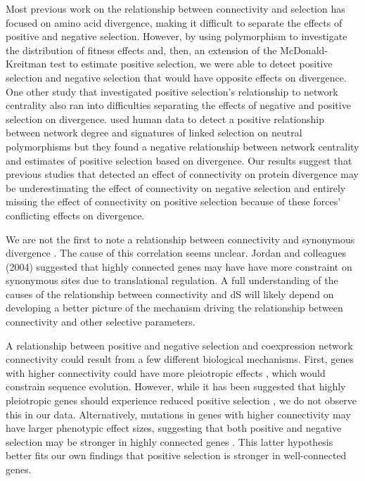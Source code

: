 Most previous work on the relationship between connectivity and selection has focused on amino acid divergence, making it difficult to separate the effects of positive and negative selection. However, by using polymorphism to investigate the distribution of fitness effects and, then, an extension of the McDonald-Kreitman test to estimate positive selection, we were able to detect positive selection and negative selection that would have opposite effects on divergence. One other study that investigated positive selection’s relationship to network centrality also ran into difficulties separating the effects of negative and positive selection on divergence. \citet{Luisi2015-zz} used human data to detect a positive relationship between network degree and signatures of linked selection on neutral polymorphisms but they found a negative relationship between network centrality and estimates of positive selection based on divergence.  Our results suggest that previous studies that detected an effect of connectivity on protein divergence may be underestimating the effect of connectivity on negative selection and entirely missing the effect of connectivity on positive selection because of these forces’ conflicting effects on divergence.

We are not the first to note a relationship between connectivity and synonymous divergence \citep{Jordan2004-vj}. The cause of this correlation seems unclear. Jordan and colleagues (2004) suggested that highly connected genes may have have more constraint on synonymous sites due to translational regulation. A full understanding of the causes of the relationship between connectivity and dS will likely depend on developing a better picture of the mechanism driving the relationship between connectivity and other selective parameters.

A relationship between positive and negative selection and coexpression network connectivity could result from a few different biological mechanisms. First, genes with higher connectivity could have more pleiotropic effects \citep{he2006}, which would constrain sequence evolution. However, while it has been suggested that highly pleiotropic genes should experience reduced positive selection \citep{orr2000, stern2008}, we do not observe this in our data. Alternatively, mutations in genes with higher connectivity may have larger phenotypic effect sizes, suggesting that both positive and negative selection may be stronger in highly connected genes \citep{Olson-Manning2012-ap}. This latter hypothesis better fits our own findings that positive selection is stronger in well-connected genes.

